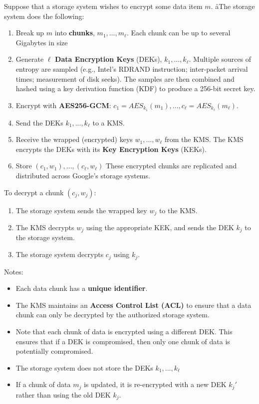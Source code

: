 \documentclass[12pt,titlepage]{article}
\begin{document}
Suppose that a storage system wishes to encrypt some data item $m$. åThe storage system does the following: \begin{enumerate}
	\item Break up $m$ into \textbf{chunks}, $m_1, ..., m_\ell$. Each chunk can be up to several Gigabytes in size
	\item Generate $\ell$ \textbf{Data Encryption Keys} (DEKs), $k_1, ..., k_\ell$. Multiple sources of entropy are sampled (e.g., Intel’s RDRAND instruction; inter-packet arrival times; measurement of disk seeks). The samples are then combined and hashed using a key derivation function (KDF) to produce a 256-bit secret key.
	\item Encrypt with \textbf{AES256-GCM}: $c_1 = AES_{k_1} (m_1),...,c_\ell = AES_{k_\ell}(m_\ell)$.
	\item Send the DEKs $k_1, ..., k_\ell$ to a KMS.
	\item Receive the wrapped (encrypted) keys $w_1, ..., w_\ell$ from the KMS. The KMS encrypts the DEKs with its \textbf{Key Encryption Keys} (KEKs).
	\item Store $(c_1, w_1),..., (c_\ell, w_\ell)$ These encrypted chunks are replicated and distributed across Google’s storage systems.
\end{enumerate}

To decrypt a chunk $(c_j , w_j)$: \begin{enumerate}
	\item The storage system sends the wrapped key $w_j$ to the KMS.
	\item The KMS decrypts $w_j$ using the appropriate KEK, and sends the DEK $k_j$ to the storage system.
	\item The storage system decrypts $c_j$ using $k_j$.
\end{enumerate}

Notes: \begin{itemize}
	\item Each data chunk has a \textbf{unique identifier}.
	\item The KMS maintains an \textbf{Access Control List (ACL)} to ensure that a data chunk can only be decrypted by the authorized storage system.
	\item Note that each chunk of data is encrypted using a different DEK. This ensures that if a DEK is compromised, then only one chunk of data is potentially compromised.
	\item The storage system does not store the DEKs $k_1, ..., k_\ell$
	\item If a chunk of data $m_j$ is updated, it is re-encrypted with a new DEK $k_j'$ rather than using the old DEK $k_j$.
\end{itemize}
\end{document}
